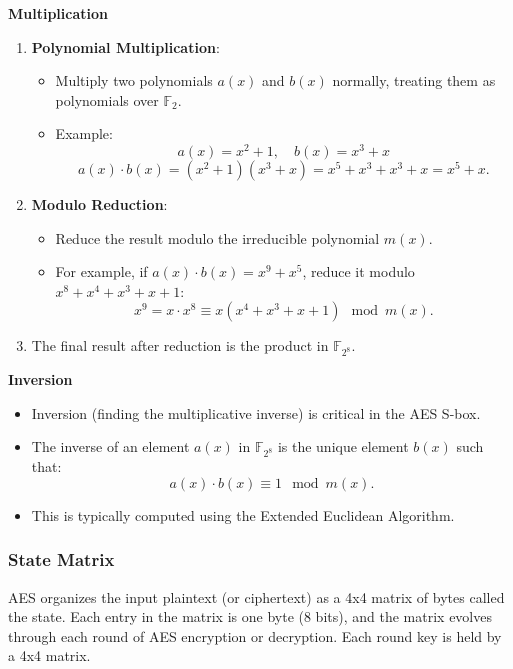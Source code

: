 \textbf{Multiplication}
\begin{enumerate}
    \item \textbf{Polynomial Multiplication}:
    \begin{itemize}
        \item Multiply two polynomials \(a(x)\) and \(b(x)\) normally, treating them as polynomials over \(\mathbb{F}_2\).
        \item Example:
        \[
        a(x) = x^2 + 1, \quad b(x) = x^3 + x
        \]
        \[
        a(x) \cdot b(x) = (x^2 + 1)(x^3 + x) = x^5 + x^3 + x^3 + x = x^5 + x.
        \]
    \end{itemize}
    \item \textbf{Modulo Reduction}:
    \begin{itemize}
        \item Reduce the result modulo the irreducible polynomial \(m(x)\).
        \item For example, if \(a(x) \cdot b(x) = x^9 + x^5\), reduce it modulo \(x^8 + x^4 + x^3 + x + 1\):
        \[
        x^9 = x \cdot x^8 \equiv x(x^4 + x^3 + x + 1) \mod m(x).
        \]
    \end{itemize}
    \item The final result after reduction is the product in \(\mathbb{F}_{2^8}\).
\end{enumerate}

\textbf{Inversion}
\begin{itemize}
    \item Inversion (finding the multiplicative inverse) is critical in the AES S-box.
    \item The inverse of an element \(a(x)\) in \(\mathbb{F}_{2^8}\) is the unique element \(b(x)\) such that:
    \[
    a(x) \cdot b(x) \equiv 1 \mod m(x).
    \]
    \item This is typically computed using the Extended Euclidean Algorithm.
\end{itemize}

\subsubsection{State Matrix}
AES organizes the input plaintext (or ciphertext) as a 4x4 matrix of bytes called the state. Each entry in the matrix is one byte (8 bits), and the matrix evolves through each round of AES encryption or decryption. Each round key is held by a 4x4 matrix.

